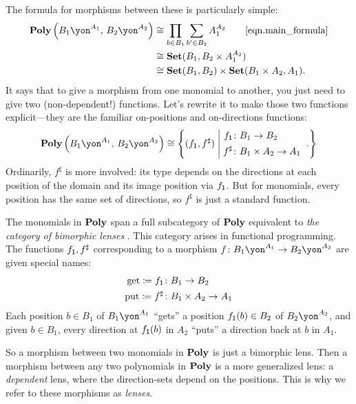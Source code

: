 \documentclass[Book-Poly]{subfiles}
\begin{document}
The formula for morphisms between these is particularly simple:
\begin{align*}
  \poly\left(B_1\yon^{A_1},\,B_2\yon^{A_2}\right) &\iso \prod_{b \in B_1} \sum_{b' \in B_2} A_1^{A_2} \tag*{\eqref{eqn.main_formula}} \\
  &\iso \smset(B_1, B_2 \times A_1^{A_2}) \\
  &\iso \smset(B_1,B_2)\times\smset(B_1\times A_2,A_1).
\end{align*}
It says that to give a morphism from one monomial to another, you just need to give two (non-dependent!) functions. Let's rewrite it to make those two functions explicit---they are the familiar on-positions and on-directions functions:
\[
  \poly\left(B_1\yon^{A_1},\,B_2\yon^{A_2}\right)
  \iso
  \left\{
    (f_\1,f^\sharp)
  \;\middle|\;
  	\parbox{1.2in}{
    $
    \begin{aligned}
  	  f_\1&\colon B_1\to B_2\\
  	  f^\sharp&\colon B_1\times A_2\to A_1
    \end{aligned}
    $
  }.
  \right\}
\]
Ordinarily, $f^\sharp$ is more involved: its type depends on the directions at each position of the domain and its image position via $f_{\textsf{1}}$.
But for monomials, every position has the same set of directions, so $f^\sharp$ is just a standard function.

The monomials in $\mathbf{Poly}$ span a full subcategory of $\mathbf{Poly}$ equivalent to \emph{the category of bimorphic lenses} \cite{hedges2018limits}.
This category arises in functional programming.
The functions $f_{\textsf{1}}, f^\sharp$ corresponding to a morphism $f \colon B_1\yon^{A_1}\to B_2\yon^{A_2}$ are given special names:
\begin{equation}\label{eqn.bimorphic_lens}
\begin{aligned}
	\mathrm{get}\coloneqq f_{\textsf{1}} &\colon B_1\to B_2\\
	\mathrm{put}\coloneqq f^\sharp &\colon B_1\times A_2\to A_1
\end{aligned}
\end{equation}
Each position $b \in B_1$ of $B_1\yon^{A_1}$ ``gets'' a position $f_{\textsf{1}}(b) \in B_2$ of $B_2\yon^{A_2}$, and given $b \in B_1$, every direction at $f_{\textsf{1}}(b)$ in $A_2$ ``puts'' a direction back at $b$ in $A_1$.

So a morphism between two monomials in $\mathbf{Poly}$ is just a bimorphic lens.
Then a morphism between any two polynomials in $\mathbf{Poly}$ is a more generalized lens: a \emph{dependent} lens, where the direction-sets depend on the positions.
This is why we refer to these morphisms as \emph{lenses}.
\end{document}
